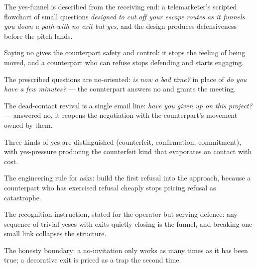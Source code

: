 

\begin{distilled}
  \item The yes-funnel is described from the receiving end: a telemarketer's scripted flowchart of small questions \emph{designed to cut off your escape routes as it funnels you down a path with no exit but yes}, and the design produces defensiveness before the pitch lands.
  \item Saying no gives the counterpart safety and control: it stops the feeling of being moved, and a counterpart who can refuse stops defending and starts engaging.
  \item The prescribed questions are no-oriented: \emph{is now a bad time?} in place of \emph{do you have a few minutes?} --- the counterpart answers no and grants the meeting.
  \item The dead-contact revival is a single email line: \emph{have you given up on this project?} --- answered no, it reopens the negotiation with the counterpart's movement owned by them.
  \item Three kinds of yes are distinguished (counterfeit, confirmation, commitment), with yes-pressure producing the counterfeit kind that evaporates on contact with cost.
\end{distilled}

\begin{unique}
  \item The engineering rule for asks: build the first refusal into the approach, because a counterpart who has exercised refusal cheaply stops pricing refusal as catastrophe.
  \item The recognition instruction, stated for the operator but serving defence: any sequence of trivial yeses with exits quietly closing is the funnel, and breaking one small link collapses the structure.
  \item The honesty boundary: a no-invitation only works as many times as it has been true; a decorative exit is priced as a trap the second time.
\end{unique}
